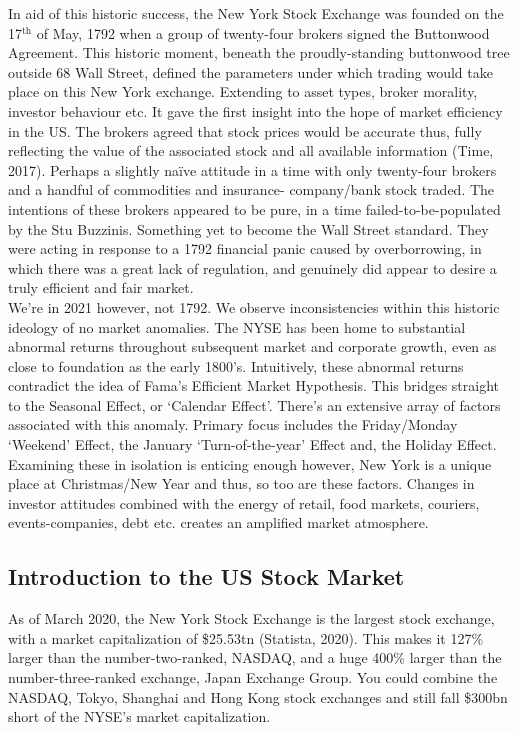 \documentclass[11pt, english]{article}
\begin{document}
	In aid of this historic success, the New York Stock Exchange was founded on the 17$\mathrm{^{th}}$ of May, 1792 when a group of twenty-four brokers signed the Buttonwood Agreement. This historic moment, beneath the proudly-standing buttonwood tree outside 68 Wall Street, defined the parameters under which trading would take place on this New York exchange. Extending to asset types, broker morality, investor behaviour etc. It gave the first insight into the hope of market efficiency in the US. The brokers agreed that stock prices would be accurate thus, fully reflecting the value of the associated stock and all available information (Time, 2017). Perhaps a slightly naïve attitude in a time with only twenty-four brokers and a handful of commodities and insurance- company/bank stock traded. The intentions of these brokers appeared to be pure, in a time failed-to-be-populated by the Stu Buzzinis. Something yet to become the Wall Street standard. They were acting in response to a 1792 financial panic caused by overborrowing, in which there was a great lack of regulation, and genuinely did appear to desire a truly efficient and fair market.\\

	We’re in 2021 however, not 1792. We observe inconsistencies within this historic ideology of no market anomalies. The NYSE has been home to substantial abnormal returns throughout subsequent market and corporate growth, even as close to foundation as the early 1800’s. Intuitively, these abnormal returns contradict the idea of Fama’s Efficient Market Hypothesis. This bridges straight to the Seasonal Effect, or `Calendar Effect'. There’s an extensive array of factors associated with this anomaly. Primary focus includes the Friday/Monday `Weekend' Effect, the January `Turn-of-the-year' Effect and, the Holiday Effect. Examining these in isolation is enticing enough however, New York is a unique place at Christmas/New Year and thus, so too are these factors. Changes in investor attitudes combined with the energy of retail, food markets, couriers, events-companies, debt etc. creates an amplified market atmosphere.

	\newpage

	\subsection{Introduction to the US Stock Market}

	As of March 2020, the New York Stock Exchange is the largest stock exchange, with a market capitalization of \$25.53tn (Statista, 2020). This makes it 127\% larger than the number-two-ranked, NASDAQ, and a huge 400\% larger than the number-three-ranked exchange, Japan Exchange Group. You could combine the NASDAQ, Tokyo, Shanghai and Hong Kong stock exchanges and still fall \$300bn short of the NYSE’s market capitalization.\\
\end{document}
